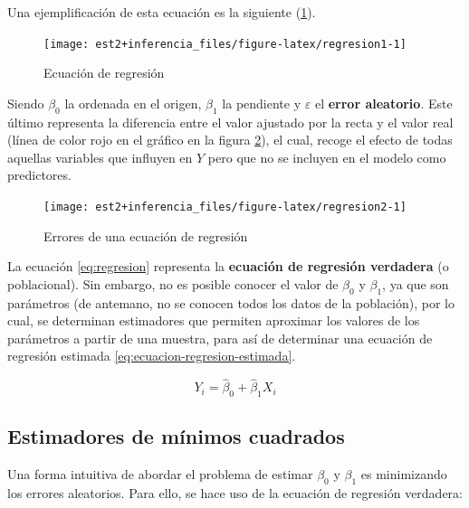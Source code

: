 \documentclass[
  11pt,
]{book}
\theoremstyle{definition}
\theoremstyle{definition}
\theoremstyle{definition}
\theoremstyle{definition}
\theoremstyle{remark}
\begin{document}
Una ejemplificación de esta ecuación es la siguiente (\ref{fig:regresion1}).

\begin{figure}

{\centering \texttt{[image: est2+inferencia\_files/figure-latex/regresion1-1]} 

}

\caption{Ecuación de regresión}\label{fig:regresion1}
\end{figure}

Siendo \(\beta_0\) la ordenada en el origen, \(\beta_1\) la pendiente y \(\varepsilon\) el \textbf{error aleatorio}. Este último representa la diferencia entre el valor ajustado por la recta y el valor real (línea de color rojo en el gráfico en la figura \ref{fig:regresion2}), el cual, recoge el efecto de todas aquellas variables que influyen en \(Y\) pero que no se incluyen en el modelo como predictores.

\begin{figure}

{\centering \texttt{[image: est2+inferencia\_files/figure-latex/regresion2-1]} 

}

\caption{Errores de una ecuación de regresión}\label{fig:regresion2}
\end{figure}

La ecuación \eqref{eq:regresion} representa la \textbf{ecuación de regresión verdadera} (o poblacional). Sin embargo, no es posible conocer el valor de \(\beta_0\) y \(\beta_1\), ya que son parámetros (de antemano, no se conocen todos los datos de la población), por lo cual, se determinan estimadores que permiten aproximar los valores de los parámetros a partir de una muestra, para así de determinar una ecuación de regresión estimada \eqref{eq:ecuacion-regresion-estimada}.

\begin{equation}
Y_i = \widehat{\beta}_0 + \widehat{\beta}_1X_i
\label{eq:ecuacion-regresion-estimada}
\end{equation}

\subsection{Estimadores de mínimos cuadrados}\label{EMCRLS}

Una forma intuitiva de abordar el problema de estimar \(\beta_0\) y \(\beta_1\) es minimizando los errores aleatorios. Para ello, se hace uso de la ecuación de regresión verdadera:
\end{document}
